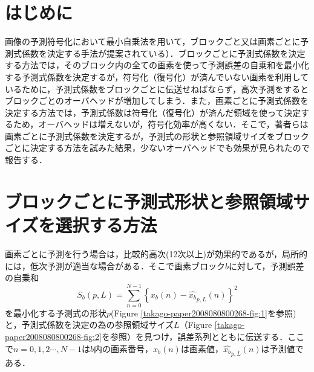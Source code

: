 \documentclass[10pt,dvipdfmx]{jsarticle}
\begin{document}
\section{はじめに}
画像の予測符号化において最小自乗法を用いて，ブロックごと又は画素ごとに予測式係数を決定する手法が提案されている）\cite{sdkguide}．ブロックごとに予測式係数を決定する方法では，そのブロック内の全ての画素を使って予測誤差の自乗和を最小化する予測式係数を決定するが，符号化（復号化）が済んでいない画素を利用しているために，予測式係数をブロックごとに伝送せねばならず，高次予測をするとブロックごとのオーバヘッドが増加してしまう．また，画素ごとに予測式係数を決定する方法では，予測式係数は符号化（復号化）が済んだ領域を使って決定するため，オーバヘッドは増えないが，符号化効率が高くない．そこで，著者らは画素ごとに予測式係数を決定するが，予測式の形状と参照領域サイズをブロックごとに決定する方法を試みた結果，少ないオーバヘッドでも効果が見られたので報告する．
\section{ブロックごとに予測式形状と参照領域サイズを選択する方法}
画素ごとに予測を行う場合は，比較的高次(12次以上)が効果的であるが，局所的には，低次予測が適当な場合がある．そこで画素ブロック$b$に対して，予測誤差の自乗和
$$
S_b(p,L)=\sum_{n=0}^{N-1} \left\{ x_b(n)-\hat{x_b}_{p,L}(n) \right\}^2
$$
を最小化する予測式の形状$p$(Figure \ref{takago-paper2008080800268-fig:1}を参照)と，予測式係数を決定の為の参照領域サイズ$L$（Figure \ref{takago-paper2008080800268-fig:2}を参照）を見つけ，誤差系列とともに伝送する．ここで$n=0,1,2\cdots,N-1$は$b$内の画素番号，$x_b(n)$は画素値，$\hat{x_b}_{p,L}(n)$は予測値である．
\end{document}
